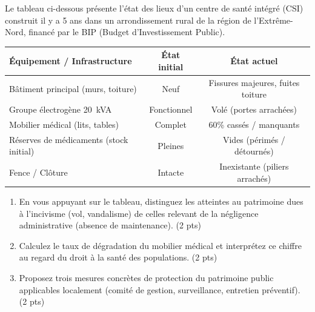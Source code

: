 \documentclass[11pt]{article}
\begin{document}
\begin{exercice}
Le tableau ci-dessous présente l'état des lieux d'un centre de santé intégré (CSI) construit il y a 5 ans dans un arrondissement rural de la région de l'Extrême-Nord, financé par le BIP (Budget d'Investissement Public).

\begin{tabular}{|l|c|c|}
\hline
\textbf{Équipement / Infrastructure} & \textbf{État initial} & \textbf{État actuel} \\ \hline
Bâtiment principal (murs, toiture) & Neuf & Fissures majeures, fuites toiture \\ \hline
Groupe électrogène \SI{20}{kVA} & Fonctionnel & Volé (portes arrachées) \\ \hline
Mobilier médical (lits, tables) & Complet & 60\% cassés / manquants \\ \hline
Réserves de médicaments (stock initial) & Pleines & Vides (périmés / détournés) \\ \hline
Fence / Clôture & Intacte & Inexistante (piliers arrachés) \\ \hline
\end{tabular}

\begin{enumerate}
    \item En vous appuyant sur le tableau, distinguez les atteintes au patrimoine dues à l'incivisme (vol, vandalisme) de celles relevant de la négligence administrative (absence de maintenance). (2 pts)
    \item Calculez le taux de dégradation du mobilier médical et interprétez ce chiffre au regard du droit à la santé des populations. (2 pts)
    \item Proposez trois mesures concrètes de protection du patrimoine public applicables localement (comité de gestion, surveillance, entretien préventif). (2 pts)
\end{enumerate}
\end{exercice}
\end{document}
